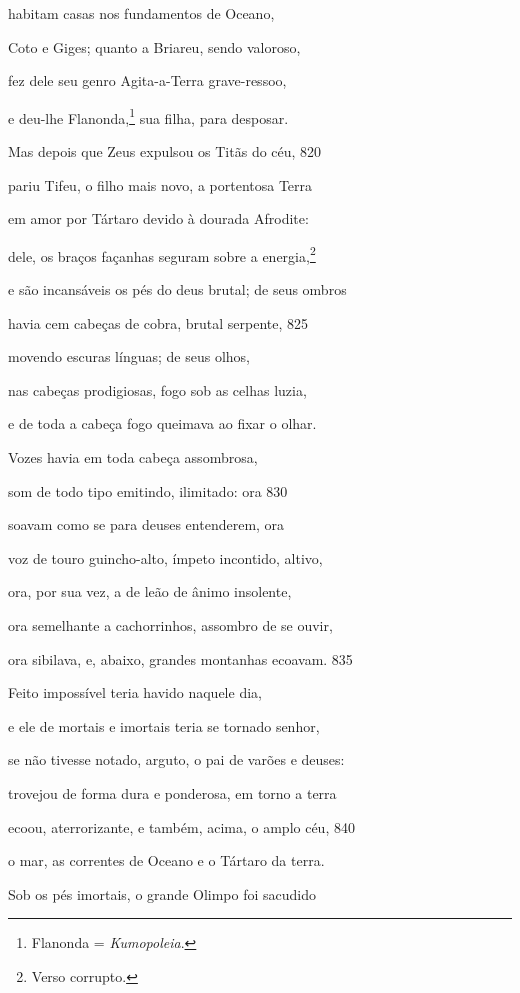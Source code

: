 habitam casas nos fundamentos de Oceano,

Coto e Giges; quanto a Briareu, sendo valoroso,

fez dele seu genro Agita-a-Terra grave-ressoo,

e deu-lhe Flanonda,\footnote{Flanonda = \emph{Kumopoleia}.} sua filha, para desposar.


Mas depois que Zeus expulsou os Titãs do céu, \num{820}

pariu Tifeu, o filho mais novo, a portentosa Terra

em amor por Tártaro devido à dourada Afrodite:

dele, os braços \dagger{}façanhas seguram sobre a energia\dagger{},\footnote{Verso corrupto.}

e são incansáveis os pés do deus brutal; de seus ombros

havia cem cabeças de cobra, brutal serpente, \num{825}

movendo escuras línguas; de seus olhos,

nas cabeças prodigiosas, fogo sob as celhas luzia,

e de toda a cabeça fogo queimava ao fixar o olhar.

Vozes havia em toda cabeça assombrosa,

som de todo tipo emitindo, ilimitado: ora \num{830}

soavam como se para deuses entenderem, ora

voz de touro guincho-alto, ímpeto incontido, altivo,

ora, por sua vez, a de leão de ânimo insolente,

ora semelhante a cachorrinhos, assombro de se ouvir,

ora sibilava, e, abaixo, grandes montanhas ecoavam. \num{835}

Feito impossível teria havido naquele dia,

e ele de mortais e imortais teria se tornado senhor,

se não tivesse notado, arguto, o pai de varões e deuses:

trovejou de forma dura e ponderosa, em torno a terra

ecoou, aterrorizante, e também, acima, o amplo céu, \num{840}

o mar, as correntes de Oceano e o Tártaro da terra.

Sob os pés imortais, o grande Olimpo foi sacudido

